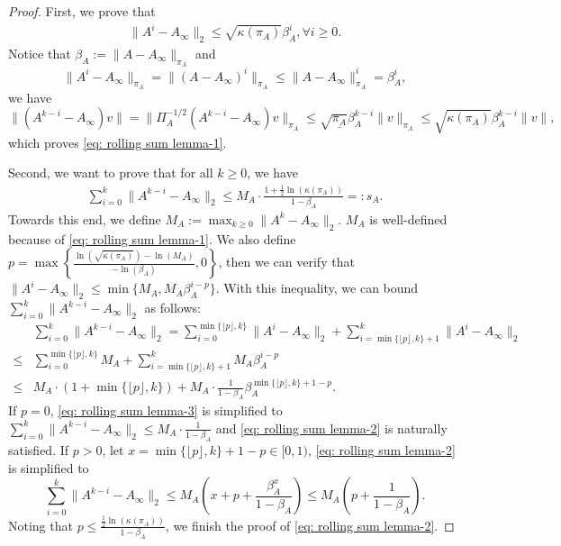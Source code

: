 \documentclass{article}
\newcommand{\norm}[1]{\| #1 \|}
\begin{document}
\begin{proof}
First, we prove that 
\begin{align}\label{eq: rolling sum lemma-1}
    \norm{A^i-A_\infty}_2\le \sqrt{\kappa(\pi_A)}\beta_A^{i}, \forall i \ge 0.
\end{align} 
Notice that $\beta_A:=\norm{A-A_\infty}_{\pi_A}$ and \[\norm{A^i-A_\infty}_{\pi_A}= \norm{(A-A_\infty)^i}_{\pi_A}\le \norm{A-A_\infty}^i_{\pi_A}=\beta_A^i,\] we have
\[
\norm{(A^{k-i}-A_\infty)v}=\norm{\Pi_A^{-1/2}(A^{k-i}-A_\infty)v}_{\pi_A}\le \sqrt{\underline{\pi_A}}\beta_A^{k-i}\norm{v}_{\pi_A}\le \sqrt{\kappa(\pi_A)}\beta_A^{k-i}\norm{v},
\]
which proves \eqref{eq: rolling sum lemma-1}. 

Second, we want to prove that for all $k \ge 0$, we have
\begin{align}\label{eq: rolling sum lemma-2}
    \sum_{i=0}^k\norm{A^{k-i}-A_\infty}_2\le M_A\cdot\frac{1+\frac{1}{2}\ln(\kappa(\pi_A))}{1-\beta_A}=: s_A.
\end{align}
Towards this end, we define $M_A:=\max_{k\ge 0}\norm{A^k-A_\infty}_2$. $M_A$ is well-defined because of \eqref{eq: rolling sum lemma-1}. We also define $p=\max\left\{\frac{\ln(\sqrt{\kappa(\pi_A)})-\ln(M_A)}{-\ln(\beta_A)}, 0\right\}$, %
then we can verify that $\norm{A^i-A_\infty}_2\le \min\{M_A, M_A\beta_A^{i-p}\}$. With this inequality, we can bound $\sum_{i=0}^k\norm{A^{k-i}-A_\infty}_2$ as follows:
\begin{align}\label{eq: rolling sum lemma-3}
    &\sum_{i=0}^k\norm{A^{k-i}-A_\infty}_2=\sum_{i=0}^{\min\{\lfloor p \rfloor, k\}}\norm{A^{i}-A_\infty}_2+ \sum_{i=\min\{\lfloor p \rfloor, k\}+1}^k\norm{A^{i}-A_\infty}_2\nonumber\\
    \le &\sum_{i=0}^{\min\{\lfloor p \rfloor, k\}} M_A+\sum_{i=\min\{\lfloor p \rfloor, k\}+1}^k M_A\beta_A^{i-p}\nonumber\\
    \le & M_A\cdot (1+\min\{\lfloor p \rfloor, k\})+M_A\cdot \frac{1}{1-\beta_A}\beta_A^{\min\{\lfloor p \rfloor, k\}+1-p}.
\end{align}
If $p=0$, \eqref{eq: rolling sum lemma-3} is simplified to $\sum_{i=0}^k\norm{A^{k-i}-A_\infty}_2\le M_A\cdot\frac{1}{1-\beta_A}$ and \eqref{eq: rolling sum lemma-2} is naturally satisfied.
If $p>0$, let $x=\min\{\lfloor p \rfloor, k\}+1-p\in [0,1)$,  \eqref{eq: rolling sum lemma-2} is simplified to 
\[
\sum_{i=0}^k\norm{A^{k-i}-A_\infty}_2\le M_A(x+p+\frac{\beta_A^x}{1-\beta_A})\le M_A(p+\frac{1}{1-\beta_A}).
\] 
Noting that $p\le \frac{\frac{1}{2}\ln(\kappa(\pi_A))}{1-\beta_A}$, we finish the proof of \eqref{eq: rolling sum lemma-2}.


\end{proof}
\end{document}
